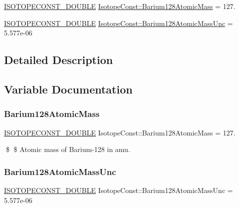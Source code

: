 \begin{DoxyCompactItemize}
\item 
\mbox{\hyperlink{group___isotope_const-_macros_ga8f45a7272ce02c0b4c65c44636ed719a}{I\+S\+O\+T\+O\+P\+E\+C\+O\+N\+S\+T\+\_\+\+D\+O\+U\+B\+LE}} \mbox{\hyperlink{group___isotope_const-_barium-_ba128_gac398f517b02d4777a586e7ed0e05734c}{Isotope\+Const\+::\+Barium128\+Atomic\+Mass}} = 127.
\item 
\mbox{\hyperlink{group___isotope_const-_macros_ga8f45a7272ce02c0b4c65c44636ed719a}{I\+S\+O\+T\+O\+P\+E\+C\+O\+N\+S\+T\+\_\+\+D\+O\+U\+B\+LE}} \mbox{\hyperlink{group___isotope_const-_barium-_ba128_ga6423282327e5893ca1a73afb8baf9a44}{Isotope\+Const\+::\+Barium128\+Atomic\+Mass\+Unc}} = 5.\+577e-\/06
\end{DoxyCompactItemize}


\subsection{Detailed Description}


\subsection{Variable Documentation}
\mbox{\label{group___isotope_const-_barium-_ba128_gac398f517b02d4777a586e7ed0e05734c}} 
\subsubsection{\texorpdfstring{Barium128\+Atomic\+Mass}{Barium128AtomicMass}}
{\footnotesize\ttfamily \mbox{\hyperlink{group___isotope_const-_macros_ga8f45a7272ce02c0b4c65c44636ed719a}{I\+S\+O\+T\+O\+P\+E\+C\+O\+N\+S\+T\+\_\+\+D\+O\+U\+B\+LE}} Isotope\+Const\+::\+Barium128\+Atomic\+Mass = 127.}

\$ \$ Atomic mass of Barium-\/128 in amu. \mbox{\label{group___isotope_const-_barium-_ba128_ga6423282327e5893ca1a73afb8baf9a44}} 
\subsubsection{\texorpdfstring{Barium128\+Atomic\+Mass\+Unc}{Barium128AtomicMassUnc}}
{\footnotesize\ttfamily \mbox{\hyperlink{group___isotope_const-_macros_ga8f45a7272ce02c0b4c65c44636ed719a}{I\+S\+O\+T\+O\+P\+E\+C\+O\+N\+S\+T\+\_\+\+D\+O\+U\+B\+LE}} Isotope\+Const\+::\+Barium128\+Atomic\+Mass\+Unc = 5.\+577e-\/06}

